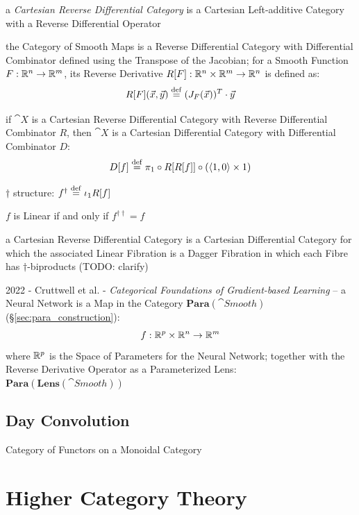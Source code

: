 a \emph{Cartesian Reverse Differential Category} is a Cartesian Left-additive
Category with a Reverse Differential Operator

the Category of Smooth Maps is a Reverse Differential Category with Differential
Combinator defined using the Transpose of the Jacobian; for a Smooth Function
$F : \mathbb{R}^n \to \mathbb{R}^m$, its Reverse Derivative
$R[F] : \mathbb{R}^n \times \mathbb{R}^m \to \mathbb{R}^n$ is defined as:
\[
  R[F](\vec{x},\vec{y}) \stackrel{\mathrm{def}}= (J_F(\vec{x}))^T \cdot \vec{y}
\]

if $\cat{X}$ is a Cartesian Reverse Differential Category with Reverse
Differential Combinator $R$, then $\cat{X}$ is a Cartesian Differential Category
with Differential Combinator $D$:
\[
  D[f] \stackrel{\mathrm{def}}= \pi_1 \circ R[R[f]] \circ (\langle{1, 0}\rangle \times 1)
\]

$\dagger$ structure: $f^\dagger \stackrel{\mathrm{def}}= \iota_1R[f]$

$f$ is Linear if and only if $f^{\dagger\dagger} = f$

a Cartesian Reverse Differential Category is a Cartesian Differential Category
for which the associated Linear Fibration is a Dagger Fibration in which each
Fibre has $\dagger$-biproducts (TODO: clarify)

2022 - Cruttwell et al. -
\emph{Categorical Foundations of Gradient-based Learning} -- a Neural Network is
a Map in the Category $\mathbf{Para}(\cat{Smooth})$
(\S\ref{sec:para_construction}):
\[
  f : \mathbb{R}^p \times \mathbb{R}^n \to \mathbb{R}^m
\]
where $\mathbb{R}^p$ is the Space of Parameters for the Neural Network; together
with the Reverse Derivative Operator as a Parameterized Lens:
$\mathbf{Para}(\mathbf{Lens}(\cat{Smooth}))$



\subsection{Day Convolution}\label{sec:day_convolution}


Category of Functors on a Monoidal Category



\section{Higher Category Theory}\label{sec:higher_category}

